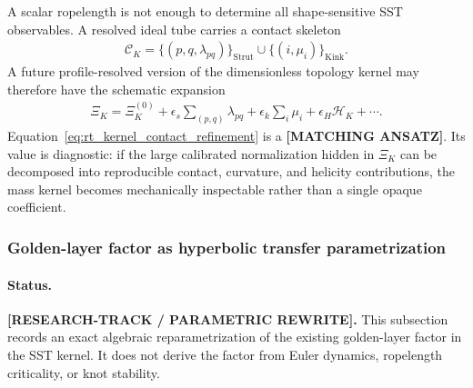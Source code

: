 A scalar ropelength is not enough to determine all shape-sensitive SST
observables.  A resolved ideal tube carries a contact skeleton
\begin{align}
    \mathcal C_K
    =
    \bigl\{(p,q,\lambda_{pq})\bigr\}_{\operatorname{Strut}}
    \cup
    \bigl\{(i,\mu_i)\bigr\}_{\operatorname{Kink}} .
    \label{eq:rt_contact_skeleton}
\end{align}
A future profile-resolved version of the dimensionless topology kernel may
therefore have the schematic expansion
\begin{align}
    \Xi_K
    =
    \Xi_K^{(0)}
    +\epsilon_s\sum_{(p,q)}\lambda_{pq}
    +\epsilon_k\sum_i\mu_i
    +\epsilon_H\mathcal H_K
    +\cdots .
    \label{eq:rt_kernel_contact_refinement}
\end{align}
Equation~\eqref{eq:rt_kernel_contact_refinement} is a
\textbf{[MATCHING ANSATZ]}.  Its value is diagnostic: if the large calibrated
normalization hidden in $\Xi_K$ can be decomposed into reproducible contact,
curvature, and helicity contributions, the mass kernel becomes mechanically
inspectable rather than a single opaque coefficient.

\subsubsection{Golden-layer factor as hyperbolic transfer parametrization}
\paragraph{Status.}
\textbf{[RESEARCH-TRACK / PARAMETRIC REWRITE].}
This subsection records an exact algebraic reparametrization of the
existing golden-layer factor in the SST kernel.  It does not derive the
factor from Euler dynamics, ropelength criticality, or knot stability.

